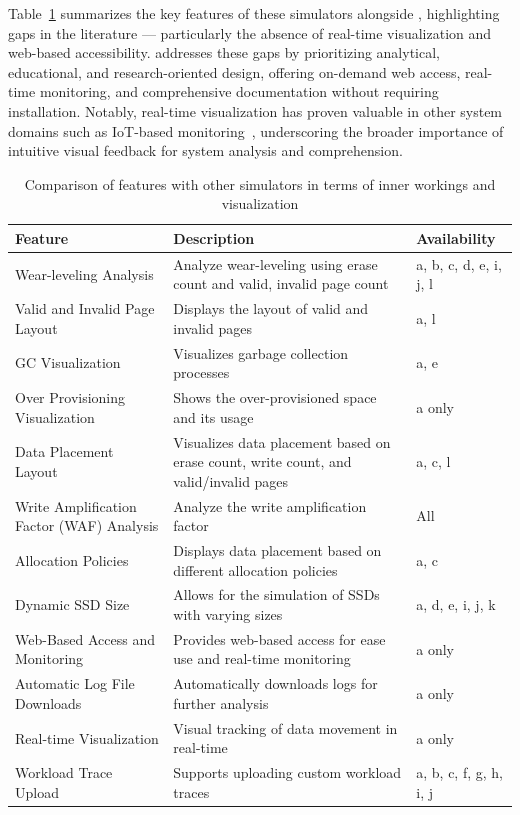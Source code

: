 \documentclass{ieeeaccess}
\begin{document}
Table~\ref{table:features} summarizes the key features of these simulators alongside \eyanassdsim, highlighting gaps in the literature --- particularly the absence of real-time visualization and web-based accessibility. \eyanassdsim addresses these gaps by prioritizing analytical, educational, and research-oriented design, offering on-demand web access, real-time monitoring, and comprehensive documentation without requiring installation. Notably, real-time visualization has proven valuable in other system domains such as IoT-based monitoring~\cite{irrigation-wsn-ieee}, underscoring the broader importance of intuitive visual feedback for system analysis and comprehension.

\begin{table}
 \centering
 \caption{Comparison of \eyanassdsim features with other simulators in terms of inner workings and visualization}
 \label{table:features}
 \begin{tabular}{|p{2cm}|p{4cm}|p{1.5cm}|}
 \hline
 \textbf{Feature} & \textbf{Description} & \textbf{Availability} \\
 \hline
 Wear-leveling Analysis & Analyze wear-leveling using erase count and valid, invalid page count & a, b, c, d, e, i, j, l \\
 \hline
 Valid and Invalid Page Layout & Displays the layout of valid and invalid pages & a, l \\
 \hline
 GC Visualization & Visualizes garbage collection processes & a, e \\
 \hline
 Over Provisioning Visualization & Shows the over-provisioned space and its usage & a only \\
 \hline
 Data Placement Layout & Visualizes data placement based on erase count, write count, and valid/invalid pages & a, c, l \\
 \hline
 Write Amplification Factor (WAF) Analysis & Analyze the write amplification factor & All \\
 \hline
 Allocation Policies & Displays data placement based on different allocation policies & a, c \\
 \hline
 Dynamic SSD Size & Allows for the simulation of SSDs with varying sizes & a, d, e, i, j, k \\
 \hline
 Web-Based Access and Monitoring & Provides web-based access for ease use and real-time monitoring & a only \\
 \hline
 Automatic Log File Downloads & Automatically downloads logs for further analysis & a only \\
 \hline
 Real-time Visualization & Visual tracking of data movement in real-time & a only \\
 \hline
 Workload Trace Upload & Supports uploading custom workload traces & a, b, c, f, g, h, i, j \\
 \hline
 \end{tabular}


\end{table}
\end{document}
